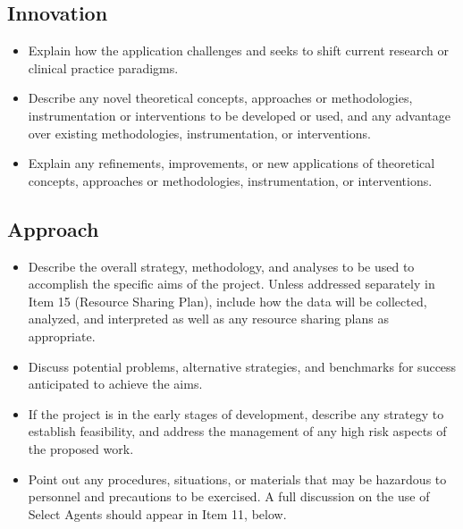\documentclass[11pt]{article}  %
\begin{document}
\subsection{Innovation}

\begin{itemize}
\item Explain how the application challenges and seeks to shift current research or clinical practice paradigms.
\item Describe any novel theoretical concepts, approaches or methodologies, instrumentation or interventions 
to be developed or used, and any advantage over existing methodologies, instrumentation, or interventions.
\item Explain any refinements, improvements, or new applications of theoretical concepts, 
approaches or methodologies, instrumentation, or interventions.
\end{itemize}

\subsection{Approach}

\begin{itemize}
\item Describe the overall strategy, methodology, and analyses to be used to accomplish the specific aims of the project. 
Unless addressed separately in Item 15 (Resource Sharing Plan), include how the data will be collected, analyzed, 
and interpreted as well as any resource sharing plans as appropriate.
\item Discuss potential problems, alternative strategies, and benchmarks for success anticipated to achieve the aims.
\item If the project is in the early stages of development, describe any strategy to establish feasibility, 
and address the management of any high risk aspects of the proposed work.
\item Point out any procedures, situations, or materials that may be hazardous to personnel and precautions to be exercised. 
A full discussion on the use of Select Agents should appear in Item 11, below. 
\end{itemize}


\end{document}
